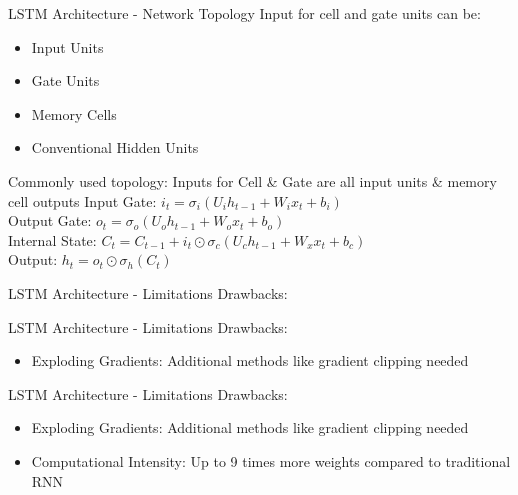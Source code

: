 \documentclass[10pt, aspectratio=169]{beamer}
\begin{document}
\begin{frame}[t]{LSTM Architecture - Network Topology}
Input for cell and gate units can be:
\begin{itemize}
    \item Input Units
    \item Gate Units
    \item Memory Cells
    \item Conventional Hidden Units
\end{itemize}
Commonly used topology: Inputs for Cell \& Gate are all input units \& memory cell outputs
Input Gate:  \begin{math}i_t=\sigma_i\left(U_{i}h_{t-1}+W_{i} x_t + b_i\right)\end{math}\\
Output Gate: \begin{math}o_t=\sigma_o\left(U_{o}h_{t-1}+W_{o}x_t + b_o\right)\end{math}\\
Internal State: \begin{math}C_t=C_{t-1}+i_t\odot\sigma_c\left(U_{c}h_{t-1}+W_{x}x_t + b_c\right)\end{math}\\
Output: \begin{math}h_t=o_t\odot\sigma_h\left(C_t\right)\end{math}
\end{frame}


\begin{frame}[t]{LSTM Architecture - Limitations}
Drawbacks:
\end{frame}

\begin{frame}[t]{LSTM Architecture - Limitations}
Drawbacks:
\begin{itemize}
    \item Exploding Gradients: Additional methods like gradient clipping needed
\end{itemize}
\end{frame}

\begin{frame}[t]{LSTM Architecture - Limitations}
Drawbacks:
\begin{itemize}
    \item Exploding Gradients: Additional methods like gradient clipping needed
    \item Computational Intensity: Up to 9 times more weights compared to traditional RNN
\end{itemize}
\end{frame}
\end{document}

